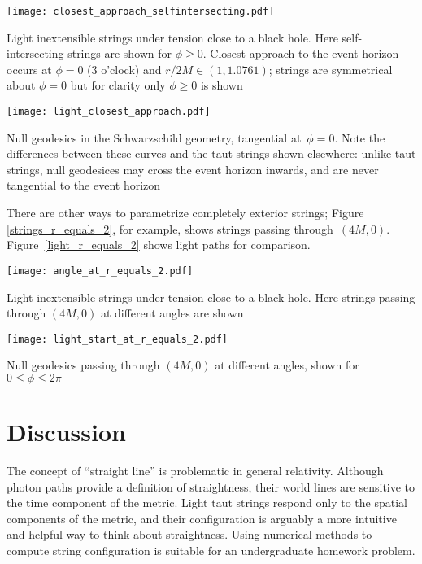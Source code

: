 \documentclass{ws-tpe}
\begin{document}
\begin{figurehere} %
  \centerline{
    \texttt{[image: closest\_approach\_selfintersecting.pdf]}
  }
  \caption{Light inextensible strings under tension close to a black
    hole.  Here self-intersecting strings are shown for $\phi\geqslant
    0$.  Closest approach to the event horizon occurs at $\phi=0$ (3
    o'clock) and $r/2M\in\left(1,1.0761\right)$; strings are symmetrical
    about $\phi=0$ but for clarity only $\phi\geqslant 0$ is shown}
  \label{closest_approach_self_intersecting}
\end{figurehere}

\begin{figurehere} %
  \centerline{
    \texttt{[image: light\_closest\_approach.pdf]}
  }
  \caption{Null geodesics in the Schwarzschild geometry, tangential
    at~$\phi=0$.  Note the differences between these curves and the taut
    strings shown elsewhere: unlike taut strings, null geodesices may
    cross the event horizon inwards, and are never tangential to the
    event horizon}
  \label{light_closest_approach}
\end{figurehere}

There are other ways to parametrize completely exterior strings;
Figure \ref{strings_r_equals_2}, for example, shows strings passing
through~$(4M,0)$.  Figure~\ref{light_r_equals_2} shows light paths for
comparison.

\begin{figurehere}
  \centerline{
    \texttt{[image: angle\_at\_r\_equals\_2.pdf]} %
  }
  \caption{Light inextensible strings under tension close to a black
    hole.  Here strings passing through $(4M,0)$ at different angles are
    shown}
  \label{strings_r_equals_2}
\end{figurehere}

\begin{figurehere}
  \centerline{
    \texttt{[image: light\_start\_at\_r\_equals\_2.pdf]} %
  }
  \caption{Null geodesics passing through $(4M,0)$ at different angles,
    shown for $0\leqslant\phi\leqslant 2\pi$}
  \label{light_r_equals_2}
\end{figurehere}

\section{Discussion}

The concept of ``straight line'' is problematic in general relativity.
Although photon paths provide a definition of straightness, their
world lines are sensitive to the time component of the metric.  Light
taut strings respond only to the spatial components of the metric, and
their configuration is arguably a more intuitive and helpful way to
think about straightness.  Using numerical methods to compute string
configuration is suitable for an undergraduate homework problem.



\end{document}
